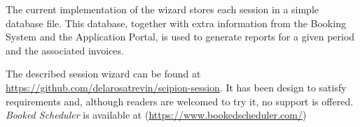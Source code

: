 The current implementation of the wizard stores each session in a simple database file. This database, together with extra information from the Booking System and the Application Portal, is used to generate reports for a given period and the associated invoices. %

The described session wizard can be found at  \url{https://github.com/delarosatrevin/scipion-session}. It has been design to satisfy \scilifelab requirements and, although readers are welcomed to try it, no support is offered.  \emph{Booked Scheduler} is available at (\url{https://www.bookedscheduler.com/})



